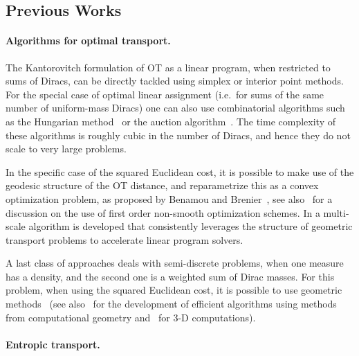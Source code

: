 \subsection{Previous Works}
\label{sec: previous works}
\paragraph{Algorithms for optimal transport.}

The Kantorovitch formulation of OT as a linear program, when restricted to sums of Diracs, can be directly tackled using simplex or interior point methods. For the special case of optimal linear assignment (i.e.\  for sums of the same number of uniform-mass Diracs) one can also use combinatorial algorithms such as the Hungarian method~\cite{Burkard09} or the auction algorithm~\cite{Bertsekas-OptimalTransport-1989}. The time complexity of these algorithms is roughly cubic in the number of Diracs, and hence they do not scale to very large problems.

In the specific case of the squared Euclidean cost, it is possible to make use of the geodesic structure of the OT distance, and reparametrize this as a convex optimization problem, as proposed by Benamou and Brenier~\cite{benamou2000computational}, see also~\cite{2014-papadakis-siims} for a discussion on the use of first order non-smooth optimization schemes.
In \cite{SchmitzerShortCuts2015} a multi-scale algorithm is developed that consistently leverages the structure of geometric transport problems to accelerate linear program solvers.

A last class of approaches deals with semi-discrete problems, when one measure has a density, and the second one is a weighted sum of Dirac masses. For this problem, when using the squared Euclidean cost, it is possible to use geometric methods~\cite{AurenhammerHA98} (see also~\cite{Merigot11} for the development of efficient algorithms using methods from computational geometry and~\cite{Levy3d} for 3-D computations).


\paragraph{Entropic transport.}

